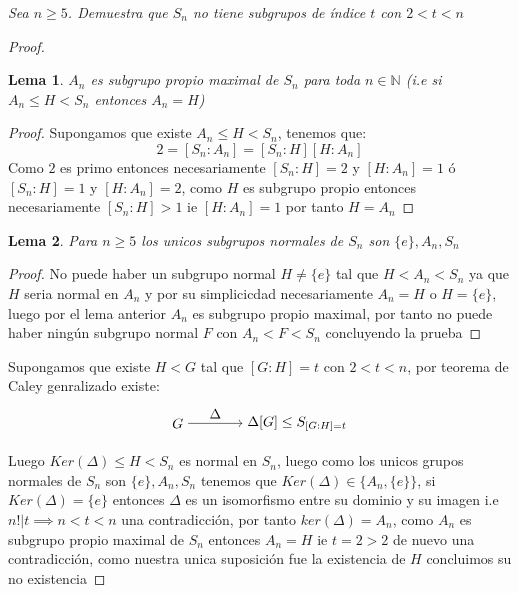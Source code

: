 \documentclass[11pt,letterpaper]{article}
\newtheorem*{lema}{Lema}
\newcommand{\N}{\mathbb{N}}
\begin{document}
\begin{tcolorbox}[
	title = \textcolor{black}{\textcolor{white}{Problema 5}},]
\textit{Sea $n\geq 5$. Demuestra que $S_n$ no tiene subgrupos de \'indice $t$
con $2<t<n$
} 
\end{tcolorbox}
\begin{proof}
     \begin{lema}
        $A_n$ es subgrupo propio maximal de $S_n$ para toda $n\in \N$ (i.e si $A_n\leq H<S_n$ entonces $A_n=H$)
    \end{lema}
    \begin{proof}
        Supongamos que existe $A_n\leq H<S_n$, tenemos que:\,\\
        \begin{equation*}
            2=[S_n:A_n]=[S_n:H][H:A_n]
        \end{equation*}
        Como $2$ es primo entonces necesariamente $[S_n:H]=2$ y $[H:A_n]=1$ \'o $[S_n:H]=1$ y $[H:A_n]=2$, como $H$ es subgrupo propio entonces necesariamente $[S_n:H]>1$ ie $[H:A_n]=1$ por tanto $H=A_n$
    \end{proof}
    \begin{lema}
        Para $n\geq 5$ los unicos subgrupos normales de $S_n$ son $\{e\},A_n, S_n$
    \end{lema}
    \begin{proof}
        No puede haber un subgrupo normal $H\neq \{e\}$ tal que $H<A_n<S_n$ ya que $H$ seria normal en $A_n$ y por su simplicicdad necesariamente $A_n=H$ o $H=\{e\}$, luego por el lema anterior
        $A_n$ es subgrupo propio maximal, por tanto no puede haber ning\'un subgrupo normal $F$ con $A_n<F<S_n$ concluyendo la prueba 
    \end{proof}
    Supongamos que existe $H<G$ tal que $[G:H]=t$ con $2<t<n$, por teorema de Caley genralizado existe:
    \shorthandoff{<>}
\[
\begin{tikzpicture}[node distance=3cm]
  \node (A) {$G$};
  \node (B) [right of=A] {$\Delta[G]\leq S_{[G:H]=t}$};
  \draw[->] (A) -- (B) node[midway, above] {$\Delta$};
\end{tikzpicture}
\]
Luego $Ker(\Delta)\leq H<S_n$ es normal en $S_n$, luego como los unicos grupos normales de $S_n$ son $\{e\},A_n,S_n$ tenemos que $Ker(\Delta)\in\{A_n,\{e\}\}$, si $Ker(\Delta)=\{e\}$ entonces $\Delta$ es un isomorfismo entre su dominio y su imagen i.e $n!|t\implies n<t<n$ una contradicción, por tanto
$ker(\Delta)=A_n$, como $A_n$ es subgrupo propio maximal de $S_n$ entonces $A_n=H$ ie $t=2>2$ de nuevo una contradicción, como nuestra unica suposici\'on fue la existencia de $H$ concluimos su no existencia 
\end{proof}
\end{document}
